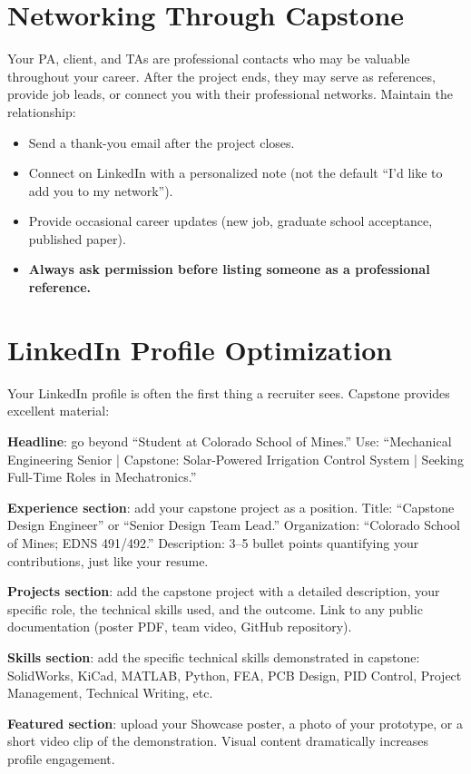 \section{Networking Through Capstone}
Your PA, client, and TAs are professional contacts who may be valuable throughout your career. After the project ends, they may serve as references, provide job leads, or connect you with their professional networks. Maintain the relationship:

\begin{itemize}[nosep,leftmargin=1.5em]
\item Send a thank-you email after the project closes.
\item Connect on LinkedIn with a personalized note (not the default ``I'd like to add you to my network'').
\item Provide occasional career updates (new job, graduate school acceptance, published paper).
\item \textbf{Always ask permission before listing someone as a professional reference.}
\end{itemize}

\section{LinkedIn Profile Optimization}
Your LinkedIn profile is often the first thing a recruiter sees. Capstone provides excellent material:

\textbf{Headline}: go beyond ``Student at Colorado School of Mines.'' Use: ``Mechanical Engineering Senior | Capstone: Solar-Powered Irrigation Control System | Seeking Full-Time Roles in Mechatronics.''

\textbf{Experience section}: add your capstone project as a position. Title: ``Capstone Design Engineer'' or ``Senior Design Team Lead.'' Organization: ``Colorado School of Mines; EDNS 491/492.'' Description: 3--5 bullet points quantifying your contributions, just like your resume.

\textbf{Projects section}: add the capstone project with a detailed description, your specific role, the technical skills used, and the outcome. Link to any public documentation (poster PDF, team video, GitHub repository).

\textbf{Skills section}: add the specific technical skills demonstrated in capstone: SolidWorks, KiCad, MATLAB, Python, FEA, PCB Design, PID Control, Project Management, Technical Writing, etc.

\textbf{Featured section}: upload your Showcase poster, a photo of your prototype, or a short video clip of the demonstration. Visual content dramatically increases profile engagement.

